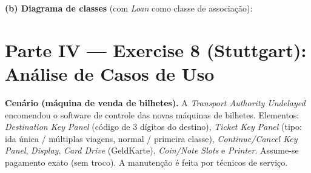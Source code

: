 \documentclass[11pt,a4paper]{article}
\begin{document}
\begin{resposta}
\textbf{(b) Diagrama de classes} (com \textit{Loan} como classe de associação):

\begin{center}
\end{center}
\end{resposta}

\section{Parte IV — Exercise 8 (Stuttgart): Análise de Casos de Uso}
\begin{nota}
\textbf{Cenário (máquina de venda de bilhetes).} A \emph{Transport Authority
Undelayed} encomendou o software de controle das novas máquinas de bilhetes.
Elementos: \emph{Destination Key Panel} (código de 3 dígitos do destino),
\emph{Ticket Key Panel} (tipo: ida única / múltiplas viagens, normal / primeira
classe), \emph{Continue/Cancel Key Panel}, \emph{Display}, \emph{Card Drive}
(GeldKarte), \emph{Coin/Note Slots} e \emph{Printer}. Assume-se pagamento exato
(sem troco). A manutenção é feita por técnicos de serviço.
\end{nota}

\end{document}
